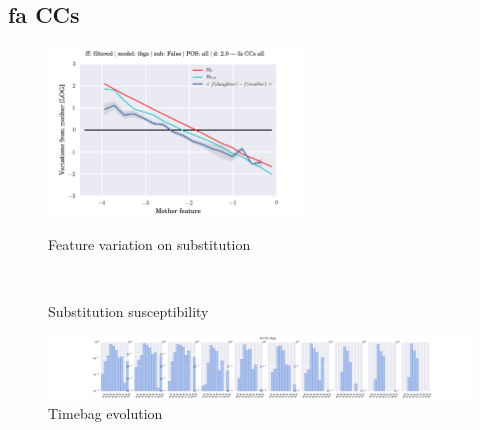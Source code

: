 \subsection{fa CCs}
\begin{figure}[h!]
    \centering
    \includegraphics[width=0.6\textwidth]{images/feature-cards/fa_CCs/feature_variations.png}
    \caption{Feature variation on substitution}
	~
	\caption{Substitution susceptibility}
    \includegraphics[width=\textwidth]{images/feature-cards/fa_CCs/timebags_evolution-hist.png}
	\caption{Timebag evolution}
\end{figure}


\clearpage
